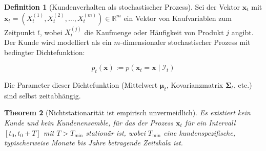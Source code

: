 \documentclass[12pt, a4paper, titlepage]{report}
\newtheorem{theorem}{Theorem}[section]
\theoremstyle{definition}
\newtheorem{definition}[theorem]{Definition}
\theoremstyle{remark}
\newcommand{\R}{\mathbb{R}}
\newcommand{\vx}{\bm{x}}
\begin{document}
\begin{definition}[Kundenverhalten als stochastischer Prozess]
Sei der Vektor $\vx_t$ mit $\vx_t = (X_t^{(1)}, X_t^{(2)}, \ldots, X_t^{(m)}) \in \R^m$ ein Vektor von Kaufvariablen zum Zeitpunkt $t$, wobei $X_t^{(j)}$ die Kaufmenge oder Häufigkeit von Produkt $j$ angibt. Der Kunde wird modelliert als ein $m$-dimensionaler stochastischer Prozess mit bedingter Dichtefunktion:

\begin{equation}
p_t(\vx) := p(\vx_t = \vx \mid \mathcal{I}_t)
\label{eq:customer_pdf}
\end{equation}

Die Parameter dieser Dichtefunktion (Mittelwert $\bm{\mu}_t$, Kovarianzmatrix $\bm{\Sigma}_t$, etc.) sind selbst zeitabhängig.
\end{definition}

\begin{theorem}[Nichtstationarität ist empirisch unvermeidlich]
\label{thm:nonstationarity}
Es existiert kein Kunde und kein Kundenensemble, für das der Prozess $\vx_t$ für ein Intervall $[t_0, t_0 + T]$ mit $T > T_{\min}$ stationär ist, wobei $T_{\min}$ eine kundenspezifische, typischerweise Monate bis Jahre betragende Zeitskala ist.
\end{theorem}
\end{document}
